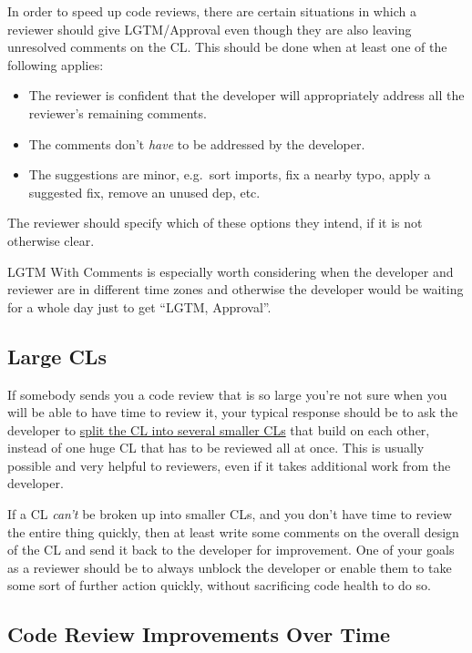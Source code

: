 \documentclass[
]{article}
\providecommand{\tightlist}{%
  \setlength{\itemsep}{0pt}\setlength{\parskip}{0pt}}
\begin{document}
In order to speed up code reviews, there are certain situations in which
a reviewer should give LGTM/Approval even though they are also leaving
unresolved comments on the CL. This should be done when at least one of
the following applies:

\begin{itemize}
\tightlist
\item
  The reviewer is confident that the developer will appropriately
  address all the reviewer's remaining comments.
\item
  The comments don't \emph{have} to be addressed by the developer.
\item
  The suggestions are minor, e.g.~sort imports, fix a nearby typo, apply
  a suggested fix, remove an unused dep, etc.
\end{itemize}

The reviewer should specify which of these options they intend, if it is
not otherwise clear.

LGTM With Comments is especially worth considering when the developer
and reviewer are in different time zones and otherwise the developer
would be waiting for a whole day just to get ``LGTM, Approval''.

\subsection{Large CLs}\label{large}

If somebody sends you a code review that is so large you're not sure
when you will be able to have time to review it, your typical response
should be to ask the developer to \href{../developer/small-cls.md}{split
the CL into several smaller CLs} that build on each other, instead of
one huge CL that has to be reviewed all at once. This is usually
possible and very helpful to reviewers, even if it takes additional work
from the developer.

If a CL \emph{can't} be broken up into smaller CLs, and you don't have
time to review the entire thing quickly, then at least write some
comments on the overall design of the CL and send it back to the
developer for improvement. One of your goals as a reviewer should be to
always unblock the developer or enable them to take some sort of further
action quickly, without sacrificing code health to do so.

\subsection{Code Review Improvements Over Time}\label{time}
\end{document}
